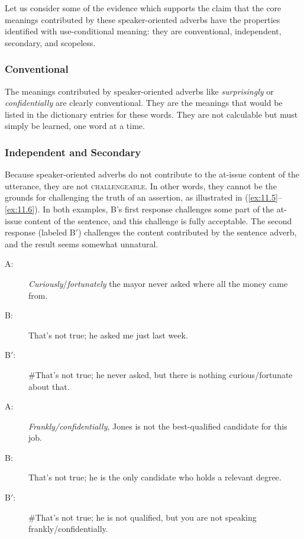 Let us consider some of the evidence which supports the claim that the core meanings contributed by these speaker-oriented adverbs have the properties identified with use-conditional meaning: they are conventional, independent, secondary, and scopeless.



\subsubsection{Conventional}

The meanings contributed by speaker-oriented adverbs like \textit{surprisingly} or \textit{confidentially} are clearly conventional. They are the meanings that would be listed in the dictionary entries for these words. They are not calculable but must simply be learned, one word at a time.


\subsubsection{Independent and Secondary}

Because speaker-oriented adverbs do not contribute to the at-issue content of the utterance, they are not \textsc{challengeable}. In other words, they cannot be the grounds for challenging the truth of an assertion, as illustrated in (\ref{ex:11.5}–\ref{ex:11.6}). In both examples, B’s first response challenges some part of the at-issue content of the sentence, and this challenge is fully acceptable. The second response (labeled B$'$) challenges the content contributed by the sentence adverb, and the result seems somewhat unnatural.



\ea \label{ex:11.5}
\begin{description}
\item[A:] \textit{Curiously}/\textit{fortunately} the mayor never asked where all the money came from.
\item[B:] That’s not true; he asked me just last week.
\item[B$'$:] \#That’s not true; he never asked, but there is nothing curious/fortunate about that.
\end{description}
\ex \label{ex:11.6}
\begin{description}
\item[A:] \textit{Frankly/confidentially}, Jones is not the best-qualified candidate for this job.
\item[B:] That’s not true; he is the only candidate who holds a relevant degree.
\item[B$'$:] \#That’s not true; he is not qualified, but you are not speaking frankly/confidentially.
\end{description}
\z


